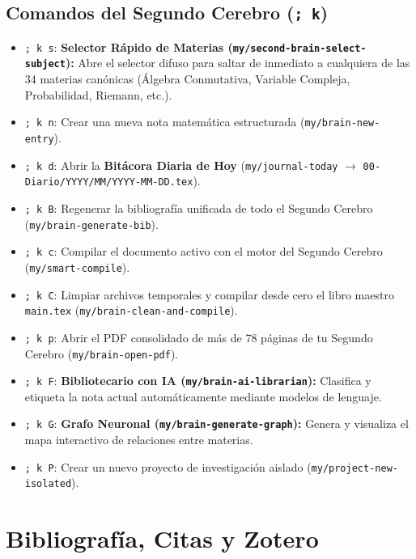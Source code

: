 \documentclass[11pt,book,spanish,alphabetic]{apuntes-scr}
\begin{document}
\section{Comandos del Segundo Cerebro (\texttt{; k})}
\begin{itemize}[leftmargin=8mm]
    \item \texttt{; k s}: \textbf{Selector Rápido de Materias (\texttt{my/second-brain-select-subject}):} Abre el selector difuso para saltar de inmediato a cualquiera de las 34 materias canónicas (Álgebra Conmutativa, Variable Compleja, Probabilidad, Riemann, etc.).
    \item \texttt{; k n}: Crear una nueva nota matemática estructurada (\texttt{my/brain-new-entry}).
    \item \texttt{; k d}: Abrir la \textbf{Bitácora Diaria de Hoy} (\texttt{my/journal-today} $\to$ \texttt{00-Diario/YYYY/MM/YYYY-MM-DD.tex}).
    \item \texttt{; k B}: Regenerar la bibliografía unificada de todo el Segundo Cerebro (\texttt{my/brain-generate-bib}).
    \item \texttt{; k c}: Compilar el documento activo con el motor del Segundo Cerebro (\texttt{my/smart-compile}).
    \item \texttt{; k C}: Limpiar archivos temporales y compilar desde cero el libro maestro \texttt{main.tex} (\texttt{my/brain-clean-and-compile}).
    \item \texttt{; k p}: Abrir el PDF consolidado de más de 78 páginas de tu Segundo Cerebro (\texttt{my/brain-open-pdf}).
    \item \texttt{; k F}: \textbf{Bibliotecario con IA (\texttt{my/brain-ai-librarian}):} Clasifica y etiqueta la nota actual automáticamente mediante modelos de lenguaje.
    \item \texttt{; k G}: \textbf{Grafo Neuronal (\texttt{my/brain-generate-graph}):} Genera y visualiza el mapa interactivo de relaciones entre materias.
    \item \texttt{; k P}: Crear un nuevo proyecto de investigación aislado (\texttt{my/project-new-isolated}).
\end{itemize}

\chapter{Bibliografía, Citas y Zotero}
\end{document}
